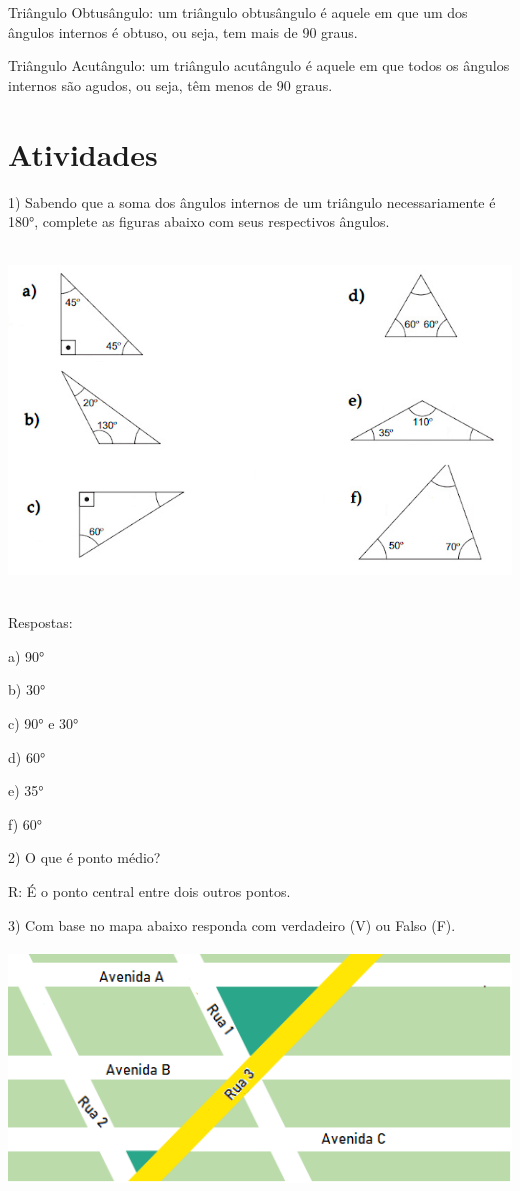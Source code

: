 Triângulo Obtusângulo: um triângulo obtusângulo é aquele em que um dos
ângulos internos é obtuso, ou seja, tem mais de 90 graus.

Triângulo Acutângulo: um triângulo acutângulo é aquele em que todos os
ângulos internos são agudos, ou seja, têm menos de 90 graus.

\section{Atividades}

1) Sabendo que a soma dos ângulos internos de um triângulo
necessariamente é 180°, complete as figuras abaixo com seus respectivos
ângulos.

\includegraphics[width=5.90625in,height=3.63542in]{./imgSAEB_6_MAT/media/image52.png}

Respostas:

a) 90°

b) 30°

c) 90° e 30°

d) 60°

e) 35°

f) 60°

2) O que é ponto médio?

R: É o ponto central entre dois outros pontos.

3) Com base no mapa abaixo responda com verdadeiro (V) ou Falso (F).

\includegraphics[width=5.47917in,height=2.48958in]{./imgSAEB_6_MAT/media/image53.png}

